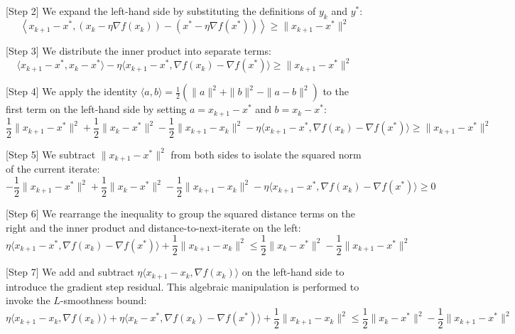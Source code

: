 \documentclass{article}
\begin{document}
[Step 2] We expand the left-hand side by substituting the definitions of $y_k$ and $y^*$:
\begin{equation}
\left\langle x_{k+1} - x^*, \left(x_k - \eta \nabla f(x_k)\right) - \left(x^* - \eta \nabla f(x^*)\right) \right\rangle \geq \|x_{k+1} - x^*\|^2
\end{equation}

[Step 3] We distribute the inner product into separate terms:
\begin{equation}
\langle x_{k+1} - x^*, x_k - x^* \rangle - \eta \langle x_{k+1} - x^*, \nabla f(x_k) - \nabla f(x^*) \rangle \geq \|x_{k+1} - x^*\|^2
\end{equation}

[Step 4] We apply the identity $\langle a, b \rangle = \frac{1}{2}(\|a\|^2 + \|b\|^2 - \|a - b\|^2)$ to the first term on the left-hand side by setting $a = x_{k+1} - x^*$ and $b = x_k - x^*$:
\begin{equation}
\frac{1}{2} \|x_{k+1} - x^*\|^2 + \frac{1}{2} \|x_k - x^*\|^2 - \frac{1}{2} \|x_{k+1} - x_k\|^2 - \eta \langle x_{k+1} - x^*, \nabla f(x_k) - \nabla f(x^*) \rangle \geq \|x_{k+1} - x^*\|^2
\end{equation}

[Step 5] We subtract $\|x_{k+1} - x^*\|^2$ from both sides to isolate the squared norm of the current iterate:
\begin{equation}
-\frac{1}{2} \|x_{k+1} - x^*\|^2 + \frac{1}{2} \|x_k - x^*\|^2 - \frac{1}{2} \|x_{k+1} - x_k\|^2 - \eta \langle x_{k+1} - x^*, \nabla f(x_k) - \nabla f(x^*) \rangle \geq 0
\end{equation}

[Step 6] We rearrange the inequality to group the squared distance terms on the right and the inner product and distance-to-next-iterate on the left:
\begin{equation}
\eta \langle x_{k+1} - x^*, \nabla f(x_k) - \nabla f(x^*) \rangle + \frac{1}{2} \|x_{k+1} - x_k\|^2 \leq \frac{1}{2} \|x_k - x^*\|^2 - \frac{1}{2} \|x_{k+1} - x^*\|^2
\end{equation}

[Step 7] We add and subtract $\eta \langle x_{k+1} - x_k, \nabla f(x_k) \rangle$ on the left-hand side to introduce the gradient step residual. This algebraic manipulation is performed to invoke the $L$-smoothness bound:
\begin{equation}
\eta \langle x_{k+1} - x_k, \nabla f(x_k) \rangle + \eta \langle x_k - x^*, \nabla f(x_k) - \nabla f(x^*) \rangle + \frac{1}{2} \|x_{k+1} - x_k\|^2 \leq \frac{1}{2} \|x_k - x^*\|^2 - \frac{1}{2} \|x_{k+1} - x^*\|^2
\end{equation}
\end{document}
